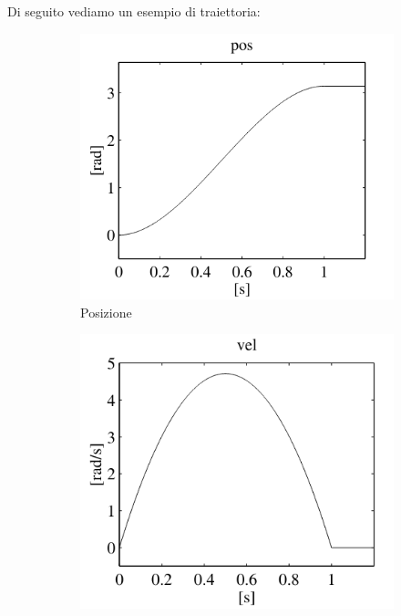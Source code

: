 Di seguito vediamo un esempio di traiettoria:
\begin{figure}[H]
	\begin{subfigure}{0.3\linewidth}
		\centering
		\includegraphics[width=\linewidth]{images/trajectories_4}
		\caption{Posizione}
		\label{fig:trajectories4}
	\end{subfigure}
	\hfill
	\begin{subfigure}{0.3\linewidth}
		\centering
		\includegraphics[width=\linewidth]{images/trajectories_5}

\end{subfigure}
\end{figure}
